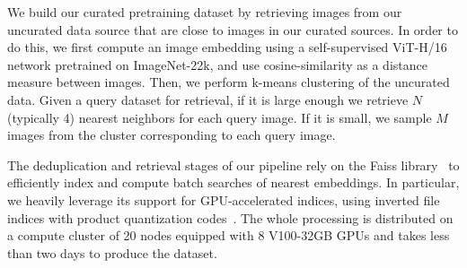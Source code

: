 We build our curated pretraining dataset by retrieving images from our uncurated data source that are close to images in our curated sources. 
In order to do this, we first compute an image embedding using a self-supervised ViT-H/16 network pretrained on ImageNet-22k, and use cosine-similarity as a distance measure between images. 
Then, we perform k-means clustering of the uncurated data. 
Given a query dataset for retrieval, if it is large enough we retrieve $N$ (typically 4) nearest neighbors for each query image.
If it is small, we sample $M$ images from the cluster corresponding to each query image. 


The deduplication and retrieval stages of our pipeline rely on the Faiss library~\citep{johnson2019billion} to efficiently index and compute batch searches of nearest embeddings. 
In particular, we heavily leverage its support for GPU-accelerated indices, using inverted file indices with product quantization codes~\citep{jegou2010product}. 
The whole processing is distributed on a compute cluster of 20 nodes equipped with 8 V100-32GB GPUs and takes less than two days to produce the \LaViDa{} dataset.
